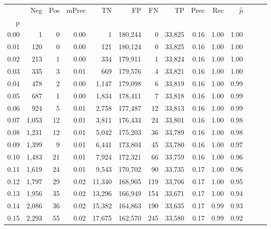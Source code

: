 \begin{tabular}{rrrrrrrrrrrrrr}
\toprule
{} &    Neg &  Pos & mPrec &       TN &       FP &      FN &      TP &  Prec &   Rec & $\hat{p}$ \\
p    &        &      &       &          &          &         &         &       &       &           \\
\midrule
0.00 &      1 &    0 &  0.00 &        1 &  180,244 &       0 &  33,825 &  0.16 &  1.00 &      1.00 \\
0.01 &    120 &    0 &  0.00 &      121 &  180,124 &       0 &  33,825 &  0.16 &  1.00 &      1.00 \\
0.02 &    213 &    1 &  0.00 &      334 &  179,911 &       1 &  33,824 &  0.16 &  1.00 &      1.00 \\
0.03 &    335 &    3 &  0.01 &      669 &  179,576 &       4 &  33,821 &  0.16 &  1.00 &      1.00 \\
0.04 &    478 &    2 &  0.00 &    1,147 &  179,098 &       6 &  33,819 &  0.16 &  1.00 &      0.99 \\
0.05 &    687 &    1 &  0.00 &    1,834 &  178,411 &       7 &  33,818 &  0.16 &  1.00 &      0.99 \\
0.06 &    924 &    5 &  0.01 &    2,758 &  177,487 &      12 &  33,813 &  0.16 &  1.00 &      0.99 \\
0.07 &  1,053 &   12 &  0.01 &    3,811 &  176,434 &      24 &  33,801 &  0.16 &  1.00 &      0.98 \\
0.08 &  1,231 &   12 &  0.01 &    5,042 &  175,203 &      36 &  33,789 &  0.16 &  1.00 &      0.98 \\
0.09 &  1,399 &    9 &  0.01 &    6,441 &  173,804 &      45 &  33,780 &  0.16 &  1.00 &      0.97 \\
0.10 &  1,483 &   21 &  0.01 &    7,924 &  172,321 &      66 &  33,759 &  0.16 &  1.00 &      0.96 \\
0.11 &  1,619 &   24 &  0.01 &    9,543 &  170,702 &      90 &  33,735 &  0.17 &  1.00 &      0.96 \\
0.12 &  1,797 &   29 &  0.02 &   11,340 &  168,905 &     119 &  33,706 &  0.17 &  1.00 &      0.95 \\
0.13 &  1,956 &   35 &  0.02 &   13,296 &  166,949 &     154 &  33,671 &  0.17 &  1.00 &      0.94 \\
0.14 &  2,086 &   36 &  0.02 &   15,382 &  164,863 &     190 &  33,635 &  0.17 &  0.99 &      0.93 \\
0.15 &  2,293 &   55 &  0.02 &   17,675 &  162,570 &     245 &  33,580 &  0.17 &  0.99 &      0.92 \\

\end{tabular}
